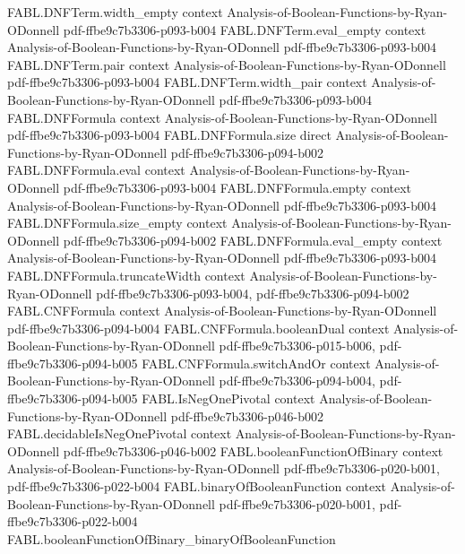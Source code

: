 \begin{theorem}
\proofstep
  {FABL.DNFTerm.width_empty}
  {context}
  {Analysis-of-Boolean-Functions-by-Ryan-ODonnell}
  {pdf-ffbe9c7b3306-p093-b004}
\proofstep
  {FABL.DNFTerm.eval_empty}
  {context}
  {Analysis-of-Boolean-Functions-by-Ryan-ODonnell}
  {pdf-ffbe9c7b3306-p093-b004}
\proofstep
  {FABL.DNFTerm.pair}
  {context}
  {Analysis-of-Boolean-Functions-by-Ryan-ODonnell}
  {pdf-ffbe9c7b3306-p093-b004}
\proofstep
  {FABL.DNFTerm.width_pair}
  {context}
  {Analysis-of-Boolean-Functions-by-Ryan-ODonnell}
  {pdf-ffbe9c7b3306-p093-b004}
\proofstep
  {FABL.DNFFormula}
  {context}
  {Analysis-of-Boolean-Functions-by-Ryan-ODonnell}
  {pdf-ffbe9c7b3306-p093-b004}
\proofstep
  {FABL.DNFFormula.size}
  {direct}
  {Analysis-of-Boolean-Functions-by-Ryan-ODonnell}
  {pdf-ffbe9c7b3306-p094-b002}
\proofstep
  {FABL.DNFFormula.eval}
  {context}
  {Analysis-of-Boolean-Functions-by-Ryan-ODonnell}
  {pdf-ffbe9c7b3306-p093-b004}
\proofstep
  {FABL.DNFFormula.empty}
  {context}
  {Analysis-of-Boolean-Functions-by-Ryan-ODonnell}
  {pdf-ffbe9c7b3306-p093-b004}
\proofstep
  {FABL.DNFFormula.size_empty}
  {context}
  {Analysis-of-Boolean-Functions-by-Ryan-ODonnell}
  {pdf-ffbe9c7b3306-p094-b002}
\proofstep
  {FABL.DNFFormula.eval_empty}
  {context}
  {Analysis-of-Boolean-Functions-by-Ryan-ODonnell}
  {pdf-ffbe9c7b3306-p093-b004}
\proofstep
  {FABL.DNFFormula.truncateWidth}
  {context}
  {Analysis-of-Boolean-Functions-by-Ryan-ODonnell}
  {pdf-ffbe9c7b3306-p093-b004,
    pdf-ffbe9c7b3306-p094-b002}
\proofstep
  {FABL.CNFFormula}
  {context}
  {Analysis-of-Boolean-Functions-by-Ryan-ODonnell}
  {pdf-ffbe9c7b3306-p094-b004}
\proofstep
  {FABL.CNFFormula.booleanDual}
  {context}
  {Analysis-of-Boolean-Functions-by-Ryan-ODonnell}
  {pdf-ffbe9c7b3306-p015-b006,
    pdf-ffbe9c7b3306-p094-b005}
\proofstep
  {FABL.CNFFormula.switchAndOr}
  {context}
  {Analysis-of-Boolean-Functions-by-Ryan-ODonnell}
  {pdf-ffbe9c7b3306-p094-b004,
    pdf-ffbe9c7b3306-p094-b005}
\proofstep
  {FABL.IsNegOnePivotal}
  {context}
  {Analysis-of-Boolean-Functions-by-Ryan-ODonnell}
  {pdf-ffbe9c7b3306-p046-b002}
\proofstep
  {FABL.decidableIsNegOnePivotal}
  {context}
  {Analysis-of-Boolean-Functions-by-Ryan-ODonnell}
  {pdf-ffbe9c7b3306-p046-b002}
\proofstep
  {FABL.booleanFunctionOfBinary}
  {context}
  {Analysis-of-Boolean-Functions-by-Ryan-ODonnell}
  {pdf-ffbe9c7b3306-p020-b001,
    pdf-ffbe9c7b3306-p022-b004}
\proofstep
  {FABL.binaryOfBooleanFunction}
  {context}
  {Analysis-of-Boolean-Functions-by-Ryan-ODonnell}
  {pdf-ffbe9c7b3306-p020-b001,
    pdf-ffbe9c7b3306-p022-b004}
\proofstep
  {FABL.booleanFunctionOfBinary_binaryOfBooleanFunction}

\end{theorem}
